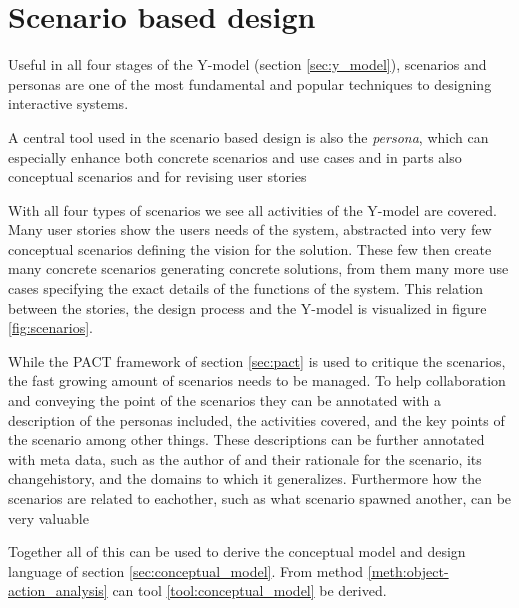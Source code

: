 \section{Scenario based design} \label{sec:scenario_based_design}
Useful in all four stages of the Y-model (section \ref{sec:y_model}), scenarios and personas are one of the most fundamental and popular techniques to designing interactive systems. \cite[p. 62]{benyon_14}






A central tool used in the scenario based design is also the \emph{persona}, which can especially enhance both concrete scenarios and use cases and in parts also conceptual scenarios and for revising user stories



With all four types of scenarios we see all activities of the Y-model are covered. Many user stories show the users needs of the system, abstracted into very few conceptual scenarios defining the vision for the solution. These few then create many concrete scenarios generating concrete solutions, from them many more use cases specifying the exact details of the functions of the system. This relation between the stories, the design process and the Y-model is visualized in figure \ref{fig:scenarios}. \cite[p. 66, 196]{benyon_14}





While the PACT framework of section \ref{sec:pact} is used to critique the scenarios, the fast growing amount of scenarios needs to be managed. To help collaboration and conveying the point of the scenarios they can be annotated with a description of the personas included, the activities covered, and the key points of the scenario among other things. These descriptions can be further annotated with meta data, such as the author of and their rationale for the scenario, its changehistory, and the domains to which it generalizes. Furthermore how the scenarios are related to eachother, such as what scenario spawned another, can be very valuable \cite[p. 70,72]{benyon_14}





Together all of this can be used to derive the conceptual model and design language of section \ref{sec:conceptual_model}. From method \ref{meth:object-action_analysis} can tool \ref{tool:conceptual_model} be derived. \cite[p. 67]{benyon_14}
